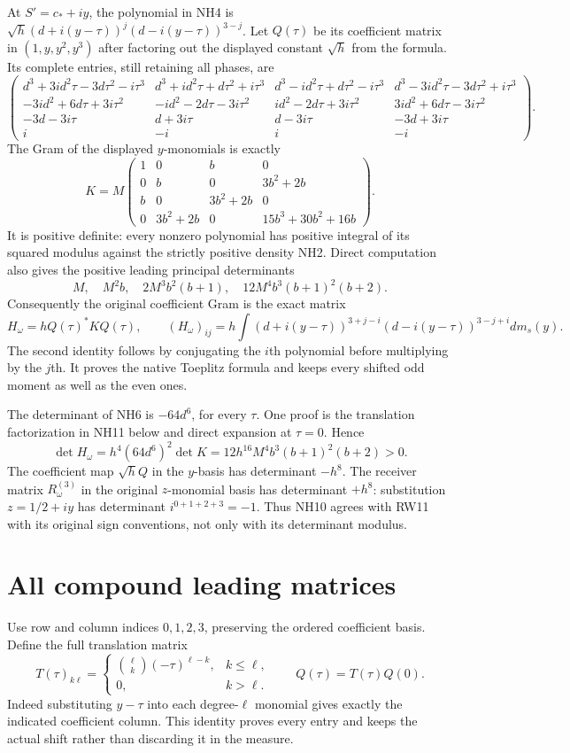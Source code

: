 At $S'=c_*+iy$, the polynomial in NH4 is
$\sqrt h(d+i(y-\tau))^j(d-i(y-\tau))^{3-j}$.
Let $Q(\tau)$ be its coefficient matrix in $(1,y,y^2,y^3)$ after
factoring out the displayed constant $\sqrt h$ from the formula.
Its complete entries, still retaining all phases, are
\[
\begin{pmatrix}
d^3+3id^2\tau-3d\tau^2-i\tau^3&d^3+id^2\tau+d\tau^2+i\tau^3&
d^3-id^2\tau+d\tau^2-i\tau^3&d^3-3id^2\tau-3d\tau^2+i\tau^3\\
-3id^2+6d\tau+3i\tau^2&-id^2-2d\tau-3i\tau^2&
id^2-2d\tau+3i\tau^2&3id^2+6d\tau-3i\tau^2\\
-3d-3i\tau&d+3i\tau&d-3i\tau&-3d+3i\tau\\
i&-i&i&-i
\end{pmatrix}.
\tag{NH6}
\]
The Gram of the displayed $y$-monomials is exactly
\[
 K=M\begin{pmatrix}
 1&0&b&0\\0&b&0&3b^2+2b\\
 b&0&3b^2+2b&0\\0&3b^2+2b&0&15b^3+30b^2+16b
 \end{pmatrix}.
 \tag{NH7}
\]
It is positive definite: every nonzero polynomial has positive
integral of its squared modulus against the strictly positive
density NH2. Direct computation also gives the positive leading
principal determinants
\[
 M,\quad M^2b,\quad2M^3b^2(b+1),\quad
 12M^4b^3(b+1)^2(b+2).
 \tag{NH8}
\]
Consequently the original coefficient Gram is the exact matrix
\[
 H_\omega=hQ(\tau)^*KQ(\tau),\qquad
 (H_\omega)_{ij}=h\int(d+i(y-\tau))^{3+j-i}
                      (d-i(y-\tau))^{3-j+i}dm_s(y).
 \tag{NH9}
\]
The second identity follows by conjugating the $i$th polynomial
before multiplying by the $j$th. It proves the native Toeplitz
formula and keeps every shifted odd moment as well as the even ones.

The determinant of NH6 is $-64d^6$, for every $\tau$.
One proof is the translation factorization in NH11 below and
direct expansion at $\tau=0$. Hence
\[
 \det H_\omega
 =h^4(64d^6)^2\det K
 =12h^{16}M^4b^3(b+1)^2(b+2)>0.
 \tag{NH10}
\]
The coefficient map $\sqrt h Q$ in the $y$-basis has determinant
$-h^8$. The receiver matrix $R_\omega^{(3)}$ in the original
$z$-monomial basis has determinant $+h^8$: substitution
$z=1/2+iy$ has determinant $i^{0+1+2+3}=-1$. Thus NH10
agrees with RW11 with its original sign conventions, not only
with its determinant modulus.

\section{All compound leading matrices}
Use row and column indices $0,1,2,3$, preserving the ordered
coefficient basis. Define the full translation matrix
\[
 T(\tau)_{k\ell}=\begin{cases}
 \binom\ell k(-\tau)^{\ell-k},&k\le\ell,\\0,&k>\ell.
 \end{cases}
 \qquad Q(\tau)=T(\tau)Q(0).
 \tag{NH11}
\]
Indeed substituting $y-\tau$ into each degree-$\ell$ monomial
gives exactly the indicated coefficient column. This identity
proves every entry and keeps the actual shift rather than discarding
it in the measure.

